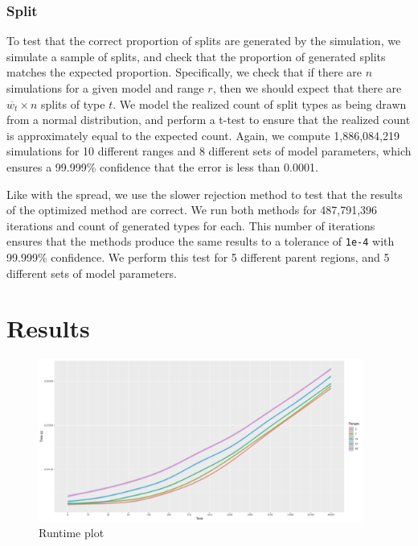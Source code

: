 \documentclass{article}
\begin{document}
\subsubsection{Split}

To test that the correct proportion of splits are generated by the simulation,
we simulate a sample of splits, and check that the proportion of generated
splits matches the expected proportion.
Specifically, we check that if there are \(n\) simulations for a given model
and range \( r \), then we should expect that there are \(\overline{w_t} \times
n\) splits of type \( t \).
We model the realized count of split types as being drawn from a normal
distribution, and perform a t-test to ensure that the realized count is
approximately equal to the expected count.
Again, we compute 1,886,084,219 simulations for 10 different ranges and 8
different sets of model parameters, which ensures a 99.999\% confidence that
the error is less than 0.0001.

Like with the spread, we use the slower rejection method to test that the
results of the optimized method are correct.
We run both methods for 487,791,396 iterations and count of generated types for
each.
This number of iterations ensures that the methods produce the same results to
a tolerance of \texttt{1e-4} with 99.999\% confidence.
We perform this test for 5 different parent regions, and 5 different sets of
model parameters.

\section{Results}

\begin{figure}
  \begin{center}
    \includegraphics[width=0.95\textwidth]{figs/bigrig-runtime-taxa-loglog-plot.png}
  \end{center}
  \caption{Runtime plot}\label{fig:runtime-taxa}
\end{figure}
\end{document}
